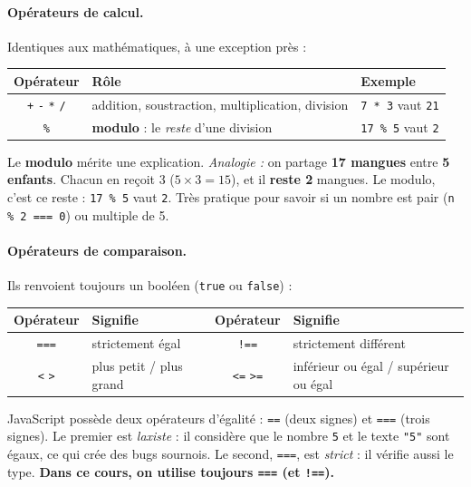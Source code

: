 \documentclass[11pt,a4paper]{article}
\newcommand{\code}[1]{\texttt{#1}}
\begin{document}
\paragraph{Opérateurs de calcul.} Identiques aux mathématiques, à une exception près :
\begin{center}
\begin{tabular}{c l l}
\toprule
\textbf{Opérateur} & \textbf{Rôle} & \textbf{Exemple} \\
\midrule
\code{+} \quad \code{-} \quad \code{*} \quad \code{/} & addition, soustraction, multiplication, division & \code{7 * 3} vaut \code{21} \\
\code{\%} & \textbf{modulo} : le \emph{reste} d'une division & \code{17 \% 5} vaut \code{2} \\
\bottomrule
\end{tabular}
\end{center}

Le \textbf{modulo} mérite une explication. \emph{Analogie :} on partage \textbf{17 mangues} entre \textbf{5 enfants}. Chacun en reçoit 3 ($5 \times 3 = 15$), et il \textbf{reste 2} mangues. Le modulo, c'est ce reste : \code{17 \% 5} vaut \code{2}. Très pratique pour savoir si un nombre est pair (\code{n \% 2 === 0}) ou multiple de 5.

\paragraph{Opérateurs de comparaison.} Ils renvoient toujours un booléen (\code{true} ou \code{false}) :
\begin{center}
\begin{tabular}{c l c l}
\toprule
\textbf{Opérateur} & \textbf{Signifie} & \textbf{Opérateur} & \textbf{Signifie} \\
\midrule
\code{===} & strictement égal & \code{!==} & strictement différent \\
\code{<} \quad \code{>} & plus petit / plus grand & \code{<=} \quad \code{>=} & inférieur ou égal / supérieur ou égal \\
\bottomrule
\end{tabular}
\end{center}

\begin{retenirbox}[Règle d'or : toujours \code{===}, jamais \code{==}]
JavaScript possède deux opérateurs d'égalité : \code{==} (deux signes) et \code{===} (trois signes). Le premier est \emph{laxiste} : il considère que le nombre \code{5} et le texte \code{"5"} sont égaux, ce qui crée des bugs sournois. Le second, \code{===}, est \emph{strict} : il vérifie aussi le type. \textbf{Dans ce cours, on utilise toujours \code{===} (et \code{!==}).}
\end{retenirbox}
\end{document}
